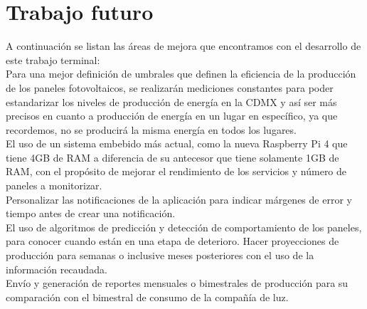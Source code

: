 \chapter{Trabajo futuro}\label{chapter7}

\newline A continuación se listan las áreas de mejora que encontramos con el desarrollo de este trabajo terminal:
\\
\newline Para una mejor definición de umbrales que definen la eficiencia de la producción de los paneles fotovoltaicos, se realizarán mediciones constantes para poder estandarizar los niveles de producción de energía en la CDMX y así ser más precisos en cuanto a producción de energía en un lugar en específico, ya que recordemos, no se producirá la misma energía en todos los lugares. 
\\
\newline El uso de un sistema embebido más actual, como la nueva Raspberry Pi 4 que tiene 4GB de RAM a diferencia de su antecesor que tiene solamente 1GB de RAM, con el propósito de mejorar el rendimiento de los servicios y número de paneles a monitorizar.
\\
\newline Personalizar las notificaciones de la aplicación para indicar márgenes de error y tiempo antes de crear una notificación.
\\
\newline El uso de algoritmos de predicción y detección de comportamiento de los paneles, para conocer cuando están en una etapa de deterioro. Hacer proyecciones de producción para semanas o inclusive meses posteriores con el uso de la información recaudada.
\\
\newline Envío y generación de reportes mensuales o bimestrales de producción para su comparación con el bimestral de consumo de la compañía de luz. 